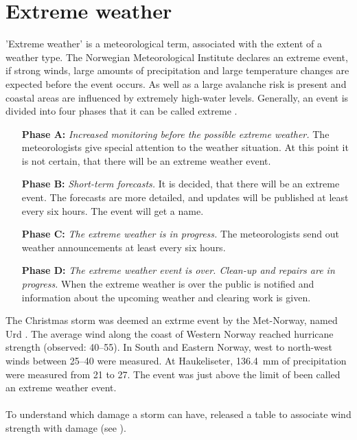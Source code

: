 \section{Extreme weather}
'Extreme weather' is a meteorological term, associated with the extent of a weather type. The Norwegian Meteorological Institute declares an extreme event, if strong winds, large amounts of precipitation and large temperature changes are expected before the event occurs. As well as a large avalanche risk is present and coastal areas are influenced by extremely high-water levels. 
Generally, an event is divided into four phases that it can be called extreme \citep{pedersen_hva_2013}. 
\begin{itemize}
	\setlength\itemsep{-.85em}
	\item[\textbf{Phase A:}] \textit{Increased monitoring before the possible extreme weather.} The meteorologists give special attention to the weather situation. At this point it is not certain, that there will be an extreme weather event.
	\item[\textbf{Phase B:}] \textit{Short-term forecasts.} It is decided, that there will be an extreme event. The forecasts are more detailed, and updates will be published at least every six hours. The event will get a name.
	\item[\textbf{Phase C:}] \textit{The extreme weather is in progress.} The meteorologists send out weather announcements at least every six hours.
	\item[\textbf{Phase D:}] \textit{The extreme weather event is over. Clean-up and repairs are in progress.} When the extreme weather is over the public is notified and information about the upcoming weather and clearing work is given.
\end{itemize}
The Christmas storm was deemed an extrme event by the Met-Norway, named Urd
\citep{olsen_ekstremvaerrapport._2017}. 
The average wind along the coast of Western Norway reached hurricane strength (observed: \SIrange{40}{55}{\mPs}). In South and Eastern Norway, west to north-west winds between \SIrange{25}{40}{\mPs} were measured.
At Haukeliseter, \SI{136.4}{\milli\metre} of precipitation were measured from \num{21} to \SI{27}{\dec}.
The event was just above the limit of been called an extreme weather event.
\\
\\
To understand which damage a storm can have, \cite{faeraas_urd_2016} released a table to associate wind strength with damage (see ).




